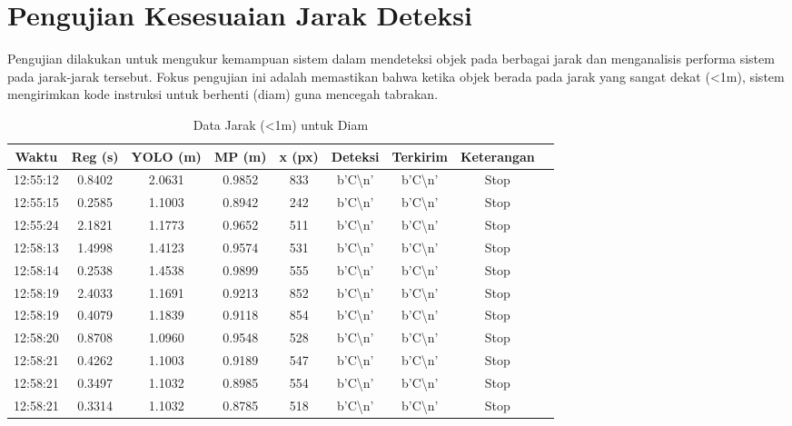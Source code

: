 \newpage
\section{Pengujian Kesesuaian Jarak Deteksi}
\label{sec:pengujiankesesuaianjarakdeteksi}

Pengujian dilakukan untuk mengukur kemampuan sistem dalam mendeteksi objek pada berbagai jarak dan menganalisis performa sistem pada jarak-jarak tersebut. Fokus pengujian ini adalah memastikan bahwa ketika objek berada pada jarak yang sangat dekat (\textless 1m), sistem mengirimkan kode instruksi untuk berhenti (diam) guna mencegah tabrakan.

\begin{table}[H]
    \centering
    \caption{Data Jarak (\textless 1m) untuk Diam}
    \label{tab:jarak_diam}
    \begin{tabular}{|c|c|c|c|c|c|c|c|c|}
    \hline
    Waktu & Reg (s) & YOLO (m) & MP (m) & x (px) & Deteksi & Terkirim & Keterangan \\ \hline
    12:55:12 & 0.8402 & 2.0631 & 0.9852 & 833 & b'C\textbackslash n' & b'C\textbackslash n' & Stop \\ \hline
    12:55:15 & 0.2585 & 1.1003 & 0.8942 & 242 & b'C\textbackslash n' & b'C\textbackslash n' & Stop \\ \hline
    12:55:24 & 2.1821 & 1.1773 & 0.9652 & 511 & b'C\textbackslash n' & b'C\textbackslash n' & Stop \\ \hline
    12:58:13 & 1.4998 & 1.4123 & 0.9574 & 531 & b'C\textbackslash n' & b'C\textbackslash n' & Stop \\ \hline
    12:58:14 & 0.2538 & 1.4538 & 0.9899 & 555 & b'C\textbackslash n' & b'C\textbackslash n' & Stop \\ \hline
    12:58:19 & 2.4033 & 1.1691 & 0.9213 & 852 & b'C\textbackslash n' & b'C\textbackslash n' & Stop \\ \hline
    12:58:19 & 0.4079 & 1.1839 & 0.9118 & 854 & b'C\textbackslash n' & b'C\textbackslash n' & Stop \\ \hline
    12:58:20 & 0.8708 & 1.0960 & 0.9548 & 528 & b'C\textbackslash n' & b'C\textbackslash n' & Stop \\ \hline
    12:58:21 & 0.4262 & 1.1003 & 0.9189 & 547 & b'C\textbackslash n' & b'C\textbackslash n' & Stop \\ \hline
    12:58:21 & 0.3497 & 1.1032 & 0.8985 & 554 & b'C\textbackslash n' & b'C\textbackslash n' & Stop \\ \hline
    12:58:21 & 0.3314 & 1.1032 & 0.8785 & 518 & b'C\textbackslash n' & b'C\textbackslash n' & Stop \\ \hline

\end{tabular}
\end{table}

